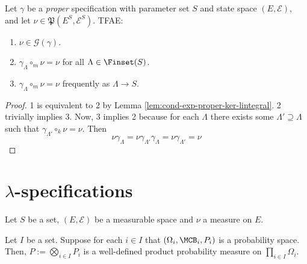 \begin{lemma}
    \label{lem:gibbs-meas-tfae}
    \leanok

    Let $\gamma$ be a {\it proper} specification with parameter set $S$ and state space $(E, \mathcal{E})$, and let $\nu\in\mathfrak{P}(E^S, \mathcal{E}^S)$. TFAE:
    \begin{enumerate}
        \item $\nu\in\mathcal{G}(\gamma)$.
        \item $\gamma_\Lambda\circ_m\nu = \nu$ for all $\Lambda\in\Finset(S)$.
        \item $\gamma_\Lambda\circ_m\nu = \nu$ frequently as $\Lambda \to S$.
    \end{enumerate}
\end{lemma}
\begin{proof}
    \leanok

    1 is equivalent to 2 by Lemma \ref{lem:cond-exp-proper-ker-lintegral}. 2 trivially implies 3. Now, 3 implies 2 because for each $\Lambda$ there exists some $\Lambda' \supseteq \Lambda$ such that
    $\gamma_{\Lambda'}\circ_k\nu = \nu$. Then
    $$\nu\gamma_\Lambda = \nu\gamma_{\Lambda'}\gamma_\Lambda = \nu\gamma_{\Lambda'} = \nu$$
\end{proof}


\section{\texorpdfstring{$\lambda$}{Lambda}-specifications}

Let $S$ be a set, $(E, \mathcal{E})$ be a measurable space and $\nu$ a measure on $E$.

\begin{definition}
    \label{def:product-probability-measure}
    \leanok{}

    Let $I$ be a set. Suppose for each $i\in I$ that $(\Omega_i,\MCB_i,P_i)$ is a probability space. Then, $P:=\bigotimes_{i\in I}P_i$ is a well-defined product probability measure on $\prod_{i\in I}\Omega_i$.
\end{definition}


